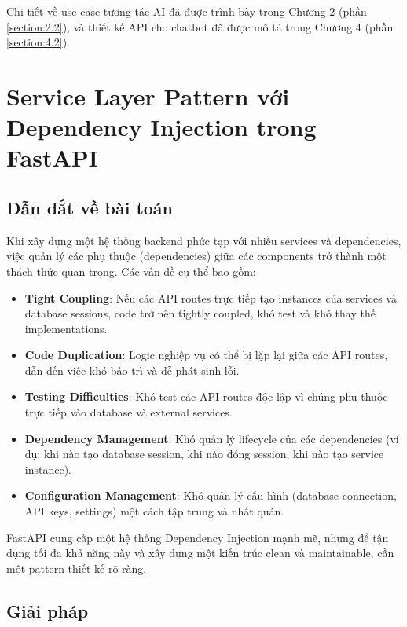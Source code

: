 \documentclass[../DoAn.tex]{subfiles}
\begin{document}
Chi tiết về use case tương tác AI đã được trình bày trong Chương 2 (phần \ref{section:2.2}), và thiết kế API cho chatbot đã được mô tả trong Chương 4 (phần \ref{section:4.2}).

\section{Service Layer Pattern với Dependency Injection trong FastAPI}
\label{section:5.4}

\subsection{Dẫn dắt về bài toán}
\label{subsection:5.4.1}

Khi xây dựng một hệ thống backend phức tạp với nhiều services và dependencies, việc quản lý các phụ thuộc (dependencies) giữa các components trở thành một thách thức quan trọng. Các vấn đề cụ thể bao gồm:

\begin{itemize}
    \item \textbf{Tight Coupling}: Nếu các API routes trực tiếp tạo instances của services và database sessions, code trở nên tightly coupled, khó test và khó thay thế implementations.
    \item \textbf{Code Duplication}: Logic nghiệp vụ có thể bị lặp lại giữa các API routes, dẫn đến việc khó bảo trì và dễ phát sinh lỗi.
    \item \textbf{Testing Difficulties}: Khó test các API routes độc lập vì chúng phụ thuộc trực tiếp vào database và external services.
    \item \textbf{Dependency Management}: Khó quản lý lifecycle của các dependencies (ví dụ: khi nào tạo database session, khi nào đóng session, khi nào tạo service instance).
    \item \textbf{Configuration Management}: Khó quản lý cấu hình (database connection, API keys, settings) một cách tập trung và nhất quán.
\end{itemize}

FastAPI cung cấp một hệ thống Dependency Injection mạnh mẽ, nhưng để tận dụng tối đa khả năng này và xây dựng một kiến trúc clean và maintainable, cần một pattern thiết kế rõ ràng.

\subsection{Giải pháp}
\label{subsection:5.4.2}
\end{document}
